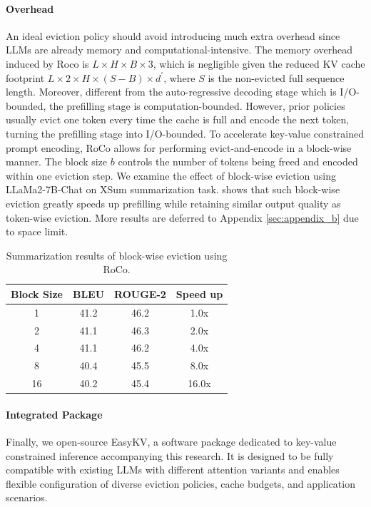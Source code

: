 \paragraph{Overhead} An ideal eviction policy should avoid introducing much extra overhead since LLMs are already memory and computational-intensive. The memory overhead induced by Roco is $L\times H\times B\times 3$, which is negligible given the reduced KV cache footprint $L\times 2\times H\times (S-B)\times d^\prime$, where $S$ is the non-evicted full sequence length. Moreover, different from the auto-regressive decoding stage which is I/O-bounded, the prefilling stage is computation-bounded. However, prior policies usually evict one token every time the cache is full and encode the next token, turning the prefilling stage into I/O-bounded. To accelerate key-value constrained prompt encoding, RoCo allows for performing evict-and-encode in a block-wise manner. The block size $b$ controls the number of tokens being freed and encoded within one eviction step. We examine the effect of block-wise eviction using LLaMa2-7B-Chat on XSum summarization task.  shows that such block-wise eviction greatly speeds up prefilling while retaining similar output quality as token-wise eviction. More results are deferred to Appendix \ref{sec:appendix_b} due to space limit.
\begin{table}[t]
    \centering
    \small
    \begin{tabular}{cccc}
    \toprule
    \textbf{Block Size} & \textbf{BLEU} & \textbf{ROUGE-2} & \textbf{Speed up} \\
    \midrule
    1                   & 41.2          & 46.2             & 1.0x              \\
    2                   & 41.1          & 46.3             & 2.0x              \\
    4                   & 41.1          & 46.2             & 4.0x              \\
    8                   & 40.4          & 45.5             & 8.0x              \\
    16                  & 40.2          & 45.4             & 16.0x             \\
    \bottomrule
    \end{tabular}
    \caption{Summarization results of block-wise eviction using RoCo. }
    \label{table:blockwise}
\end{table}
\paragraph{Integrated Package} Finally, we open-source EasyKV, a software package dedicated to key-value constrained inference accompanying this research. It is designed to be fully compatible with existing LLMs with different attention variants and enables flexible configuration of diverse eviction policies, cache budgets, and application scenarios.
